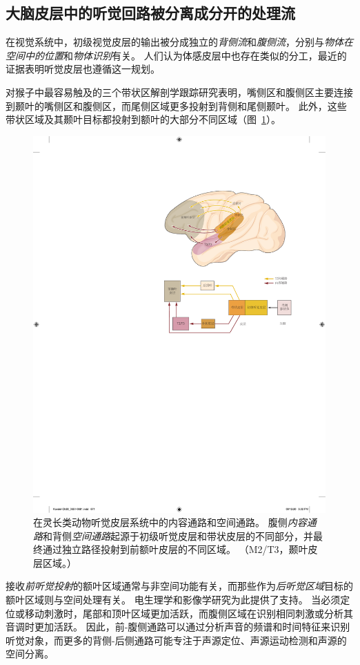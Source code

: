 \subsection{大脑皮层中的听觉回路被分离成分开的处理流}

在视觉系统中，初级视觉皮层的输出被分成独立的\textit{背侧流}和\textit{腹侧流}，分别与\textit{物体在空间中的位置}和\textit{物体识别}有关。
人们认为体感皮层中也存在类似的分工，最近的证据表明听觉皮层也遵循这一规划。


对猴子中最容易触及的三个带状区解剖学跟踪研究表明，嘴侧区和腹侧区主要连接到颞叶的嘴侧区和腹侧区，而尾侧区域更多投射到背侧和尾侧颞叶。
此外，这些带状区域及其颞叶目标都投射到额叶的大部分不同区域（图~\ref{fig:28_11}）。


\begin{figure}[htbp]
	\centering
	\includegraphics[width=0.7\linewidth]{chap28/fig_28_11}
	\caption{在灵长类动物听觉皮层系统中的内容通路和空间通路。
		腹侧\textit{内容通路}和背侧\textit{空间通路}起源于初级听觉皮层和带状皮层的不同部分，并最终通过独立路径投射到前额叶皮层的不同区域\cite{rauschecker2000mechanisms}。
		（M2/T3，颞叶皮层区域。）}
	\label{fig:28_11}
\end{figure}


接收\textit{前听觉投射}的额叶区域通常与非空间功能有关，而那些作为\textit{后听觉区域}目标的额叶区域则与空间处理有关。
电生理学和影像学研究为此提供了支持。
当必须定位或移动刺激时，尾部和顶叶区域更加活跃，而腹侧区域在识别相同刺激或分析其音调时更加活跃。
因此，前-腹侧通路可以通过分析声音的频谱和时间特征来识别听觉对象，而更多的背侧-后侧通路可能专注于声源定位、声源运动检测和声源的空间分离。


